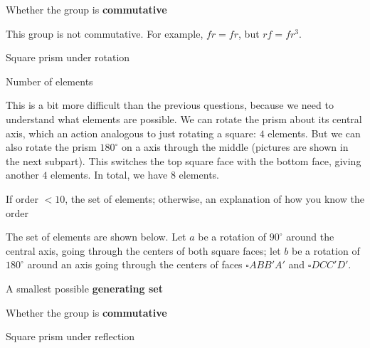 \documentclass[../gatm_answers.tex]{subfiles}
\begin{document}
\begin{inner_problem}
\item Whether the group is \textbf{commutative}
\end{inner_problem}

This group is not commutative. For example, $fr=fr$, but $rf=fr^3$.

\begin{outer_problem}
\item Square prism under rotation
\end{outer_problem}

\begin{inner_problem}[start=1]
\item Number of elements
\end{inner_problem}

This is a bit more difficult than the previous questions, because we need to understand what elements are possible. We can rotate the prism about its central axis, which an action analogous to just rotating a square: $4$ elements. But we can also rotate the prism $180^\circ$ on a axis through the middle (pictures are shown in the next subpart). This switches the top square face with the bottom face, giving another $4$ elements. In total, we have $8$ elements.

\begin{inner_problem}
\item If order $< 10$, the set of elements; otherwise, an explanation of how you know the order
\end{inner_problem}

The set of elements are shown below. Let $a$ be a rotation of $90^\circ$ around the central axis, going through the centers of both square faces; let $b$ be a rotation of $180^\circ$ around an axis going through the centers of faces $\square ABB'A'$ and $\square DCC'D'$.



\begin{inner_problem}
\item A smallest possible \textbf{generating set}
\end{inner_problem}

\begin{inner_problem}
\item Whether the group is \textbf{commutative}
\end{inner_problem}

\begin{outer_problem}
\item Square prism under reflection
\end{outer_problem}
\end{document}
